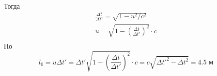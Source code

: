 \documentclass[a5paper,10pt]{article}\usepackage[usenames,dvipsnames]{color}\usepackage{extsizes,cmap,graphicx,misccorr,indentfirst,makecell,multirow,ulem,geometry,amssymb,amsfonts,amsmath,amsthm,titlesec,float,fancyhdr,wrapfig,tikz}\usepackage[T2A]{fontenc}\usepackage[utf8x]{inputenc}\usepackage[english, russian]{babel}\usetikzlibrary{decorations.pathreplacing,decorations.pathmorphing,patterns,calc,scopes,arrows,through,positioning,shapes.misc}\graphicspath{{img/}}\linespread{1.3}\frenchspacing\geometry{left=1cm, right=1cm, top=2cm, bottom=1cm, bindingoffset=0cm}\pagestyle{fancy}\fancyhead{}\fancyhead[R]{Сарафанов Ф.Г.}
\begin{document}
Тогда 
\begin{gather*}
    \frac{\Delta{t}}{\Delta{t'}}=\sqrt{1-u^2/c^2}\\
    u=\sqrt{1-\left(\frac{\Delta{t}}{\Delta{t'}}\right)^2}\cdot{c}\\
\end{gather*}
Но
\begin{equation*}
    l_0=u\Delta{t'}=\Delta{t'}\sqrt{1-\left(\frac{\Delta{t}}{\Delta{t'}}\right)^2}\cdot{c}=c\sqrt{\Delta{t'}^2-\Delta{t}^2}=4.5\text{ м}
\end{equation*}
\end{document}

